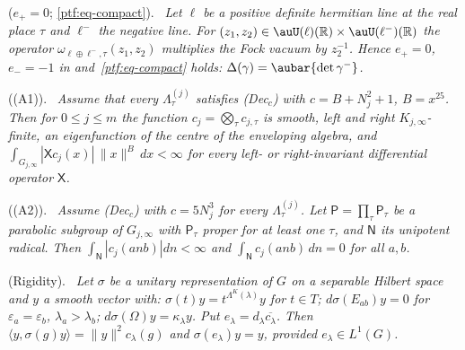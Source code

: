 \documentclass[10pt]{amsart}
\theoremstyle{definition}
\theoremstyle{remark}
\newcommand{\R}{\mathbb R}
\newenvironment{quotedthm}[2]{\par\medskip\noindent\begingroup
  \textbf{#1}#2.\ \itshape\ignorespaces}{\endgroup\par\medskip}
\begin{document}
\begin{quotedthm}{\cite[Proposition~2.21]{P49}}{ ($e_+=0$; \eqref{ptf:eq-compact})}
Let $\ell$ be a positive definite hermitian line at the real place $\tau$ and $\ell^-$ the negative
line. For $(z_1,z_2)\in\auU(\ell)(\R)\times\auU(\ell^-)(\R)$ the operator $\omega_{\ell\oplus\ell^-,\tau}
(z_1,z_2)$ multiplies the Fock vacuum by $z_2^{-1}$. Hence $e_+=0$, $e_-=-1$ in
{\cite[Lemma~2.20]{P49}} and~\eqref{ptf:eq-compact} holds: $\Delta(\gamma)=\aubar{\det\gamma^-}$.
\end{quotedthm}

\begin{quotedthm}{\cite[Theorem~3.2]{P49}}{ ((A1))}
Assume that every $\Lambda^{(j)}_\tau$ satisfies \textup{(Dec$_c$)} with $c=B+N_j^2+1$, $B=x^{25}$.
Then for $0\le j\le m$ the function $c_j=\bigotimes_\tau c_{j,\tau}$ is smooth, left and right
$K_{j,\infty}$-finite, an eigenfunction of the centre of the enveloping algebra, and
$\int_{G_{j,\infty}}|\mathsf Xc_j(x)|\,\|x\|^B\,dx<\infty$ for every left- or right-invariant
differential operator $\mathsf X$.
\end{quotedthm}

\begin{quotedthm}{\cite[Corollary~3.3]{P49}}{ ((A2))}
Assume \textup{(Dec$_c$)} with $c=5N_j^3$ for every $\Lambda^{(j)}_\tau$. Let $\mathsf P=\prod_\tau
\mathsf P_\tau$ be a parabolic subgroup of $G_{j,\infty}$ with $\mathsf P_\tau$ proper for at least
one $\tau$, and $\mathsf N$ its unipotent radical. Then $\int_{\mathsf N}|c_j(anb)|dn<\infty$ and
$\int_{\mathsf N}c_j(anb)\,dn=0$ for all $a,b$.
\end{quotedthm}

\begin{quotedthm}{\cite[Lemma~3.5]{P49}}{ (Rigidity)}
Let $\sigma$ be a unitary representation of $G$ on a separable Hilbert space and $y$ a smooth
vector with: $\sigma(t)y=t^{\Lambda^K(\lambda)}y$ for $t\in T$; $d\sigma(E_{ab})y=0$ for
$\varepsilon_a=\varepsilon_b$, $\lambda_a>\lambda_b$; $d\sigma(\Omega)y=\kappa_\lambda y$. Put
$e_\lambda=d_\lambda\overline{c_\lambda}$. Then $\langle y,\sigma(g)y\rangle=\|y\|^2c_\lambda(g)$ and
$\sigma(e_\lambda)y=y$, provided $e_\lambda\in L^1(G)$.
\end{quotedthm}
\end{document}

